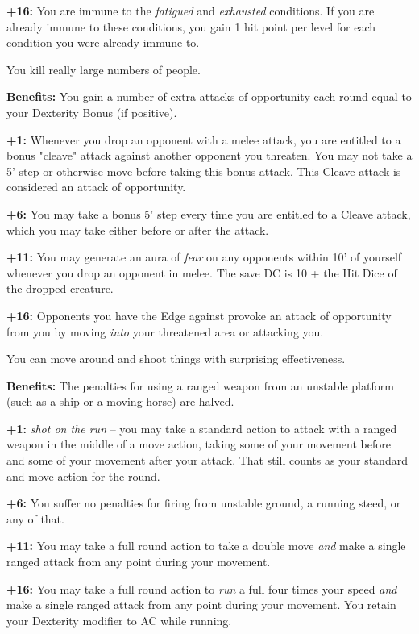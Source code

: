 \textbf{+16:} You are immune to the \textit{fatigued} and \textit{exhausted} conditions. If you are already immune to these conditions, you gain 1 hit point per level for each condition you were already immune to.


You kill really large numbers of people.

\textbf{Benefits:} You gain a number of extra attacks of opportunity each round equal to your Dexterity Bonus (if positive).

\textbf{+1:} Whenever you drop an opponent with a melee attack, you are entitled to a bonus "cleave" attack against another opponent you threaten. You may not take a 5' step or otherwise move before taking this bonus attack. This Cleave attack is considered an attack of opportunity.

\textbf{+6:} You may take a bonus 5' step every time you are entitled to a Cleave attack, which you may take either before or after the attack.

\textbf{+11:} You may generate an aura of \textit{fear} on any opponents within 10' of yourself whenever you drop an opponent in melee. The save DC is 10 + the Hit Dice of the dropped creature.

\textbf{+16:} Opponents you have the Edge against provoke an attack of opportunity from you by moving \textit{into} your threatened area or attacking you.


You can move around and shoot things with surprising effectiveness.

\textbf{Benefits:} The penalties for using a ranged weapon from an unstable platform (such as a ship or a moving horse) are halved.

\textbf{+1:} \textit{shot on the run} -- you may take a standard action to attack with a ranged weapon in the middle of a move action, taking some of your movement before and some of your movement after your attack. That still counts as your standard and move action for the round.

\textbf{+6:} You suffer no penalties for firing from unstable ground, a running steed, or any of that.

\textbf{+11:} You may take a full round action to take a double move \textit{and} make a single ranged attack from any point during your movement.

\textbf{+16:} You may take a full round action to \textit{run} a full four times your speed \textit{and} make a single ranged attack from any point during your movement. You retain your Dexterity modifier to AC while running.

